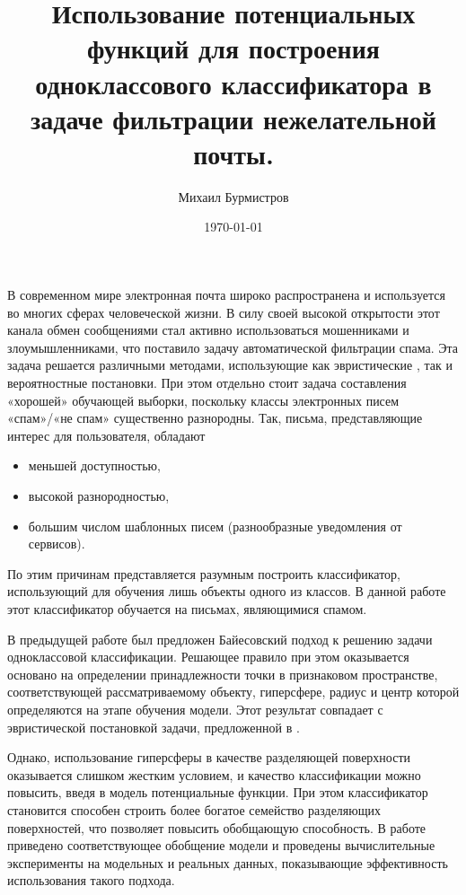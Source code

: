 \documentclass[12pt,a4paper,oneside]{article}
\begin{document}
	\title{Использование потенциальных функций для построения одноклассового классификатора в задаче фильтрации нежелательной почты.}
	\author{Михаил Бурмистров}
	\date{\today}

В современном мире электронная почта широко распространена и используется во многих сферах человеческой жизни. 
В силу своей высокой открытости этот канала обмен сообщениями стал активно использоваться мошенниками и злоумышленниками, что поставило задачу автоматической фильтрации спама. 
Эта задача решается различными методами, использующие как эвристические \cite{Islam2007, Sun2008}, так и вероятностные постановки. 
При этом отдельно стоит задача составления «хорошей» обучающей выборки, поскольку классы электронных писем  «спам»/«не спам» существенно разнородны. Так, письма, представляющие интерес для пользователя, обладают
\begin{itemize}
		\item меньшей доступностью,
		\item высокой разнородностью,
		\item большим числом шаблонных писем (разнообразные уведомления от сервисов).
\end{itemize}
По этим причинам представляется разумным построить классификатор, использующий для обучения лишь объекты одного из классов. 
В данной работе этот классификатор обучается на письмах, являющимися спамом.

В предыдущей работе \cite{JMLDA2012no4} был предложен Байесовский подход к решению задачи одноклассовой классификации. 
Решающее правило при этом оказывается основано на определении принадлежности точки в признаковом пространстве, соответствующей рассматриваемому объекту, гиперсфере, радиус и центр которой определяются на этапе обучения модели. 
Этот результат совпадает с эвристической постановкой задачи, предложенной в \cite{Tax2001}. 

Однако, использование гиперсферы  в качестве разделяющей поверхности оказывается слишком жестким условием, и качество классификации можно повысить, введя в модель потенциальные функции.
При этом классификатор становится способен строить более богатое семейство разделяющих поверхностей, что позволяет повысить обобщающую способность. 
В работе приведено соответствующее обобщение модели и проведены вычислительные эксперименты на модельных и реальных данных, показывающие эффективность использования такого подхода. 
\end{document}
